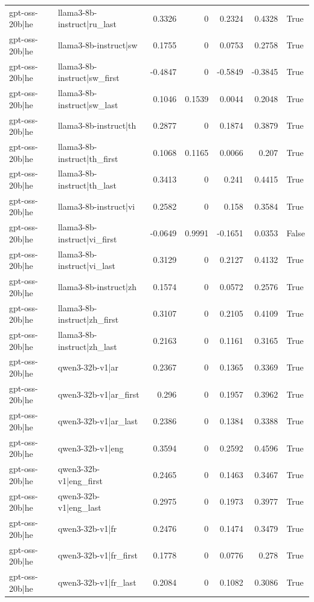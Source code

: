 \begin{table}
\begin{tabular}{l l r r r r l}
gpt-oss-20b|he & llama3-8b-instruct|ru_last & 0.3326 & 0 & 0.2324 & 0.4328 & True \\
gpt-oss-20b|he & llama3-8b-instruct|sw & 0.1755 & 0 & 0.0753 & 0.2758 & True \\
gpt-oss-20b|he & llama3-8b-instruct|sw_first & -0.4847 & 0 & -0.5849 & -0.3845 & True \\
gpt-oss-20b|he & llama3-8b-instruct|sw_last & 0.1046 & 0.1539 & 0.0044 & 0.2048 & True \\
gpt-oss-20b|he & llama3-8b-instruct|th & 0.2877 & 0 & 0.1874 & 0.3879 & True \\
gpt-oss-20b|he & llama3-8b-instruct|th_first & 0.1068 & 0.1165 & 0.0066 & 0.207 & True \\
gpt-oss-20b|he & llama3-8b-instruct|th_last & 0.3413 & 0 & 0.241 & 0.4415 & True \\
gpt-oss-20b|he & llama3-8b-instruct|vi & 0.2582 & 0 & 0.158 & 0.3584 & True \\
gpt-oss-20b|he & llama3-8b-instruct|vi_first & -0.0649 & 0.9991 & -0.1651 & 0.0353 & False \\
gpt-oss-20b|he & llama3-8b-instruct|vi_last & 0.3129 & 0 & 0.2127 & 0.4132 & True \\
gpt-oss-20b|he & llama3-8b-instruct|zh & 0.1574 & 0 & 0.0572 & 0.2576 & True \\
gpt-oss-20b|he & llama3-8b-instruct|zh_first & 0.3107 & 0 & 0.2105 & 0.4109 & True \\
gpt-oss-20b|he & llama3-8b-instruct|zh_last & 0.2163 & 0 & 0.1161 & 0.3165 & True \\
gpt-oss-20b|he & qwen3-32b-v1|ar & 0.2367 & 0 & 0.1365 & 0.3369 & True \\
gpt-oss-20b|he & qwen3-32b-v1|ar_first & 0.296 & 0 & 0.1957 & 0.3962 & True \\
gpt-oss-20b|he & qwen3-32b-v1|ar_last & 0.2386 & 0 & 0.1384 & 0.3388 & True \\
gpt-oss-20b|he & qwen3-32b-v1|eng & 0.3594 & 0 & 0.2592 & 0.4596 & True \\
gpt-oss-20b|he & qwen3-32b-v1|eng_first & 0.2465 & 0 & 0.1463 & 0.3467 & True \\
gpt-oss-20b|he & qwen3-32b-v1|eng_last & 0.2975 & 0 & 0.1973 & 0.3977 & True \\
gpt-oss-20b|he & qwen3-32b-v1|fr & 0.2476 & 0 & 0.1474 & 0.3479 & True \\
gpt-oss-20b|he & qwen3-32b-v1|fr_first & 0.1778 & 0 & 0.0776 & 0.278 & True \\
gpt-oss-20b|he & qwen3-32b-v1|fr_last & 0.2084 & 0 & 0.1082 & 0.3086 & True \\

\end{tabular}
\end{table}
